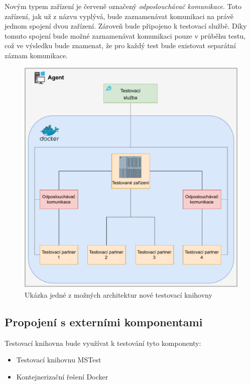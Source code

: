 Novým typem zařízení je červeně označený \textit{odposlouchávač komunikace}. Toto zařízení, jak už z názvu vyplývá, bude zaznamenávat komunikaci na právě jednom spojení dvou zařízení. Zároveň bude připojeno k testovací službě. Díky tomuto spojení bude možné zaznamenávat komunikaci pouze v průběhu testu, což ve výsledku bude znamenat, že pro každý test bude existovat separátní záznam komunikace.

\begin{figure}[H]
    \centering 
    \includegraphics[width=\textwidth]{assets/img/architecture.pdf}
    \caption{Ukázka jedné z možných architektur nové testovací knihovny}
    \label{fig:architecture}
\end{figure}

\clearpage

\subsection{Propojení s externími komponentami}

Testovací knihovna bude využívat k testování tyto komponenty:

\begin{itemize}
    \item Testovací knihovnu MSTest
    \item Kontejnerizační řešení Docker
\end{itemize}

